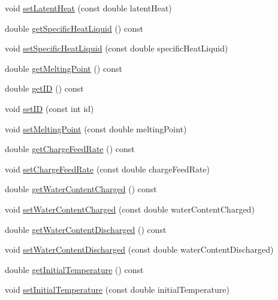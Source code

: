 \begin{DoxyCompactItemize}
void \hyperlink{class_solid_load_charge_material_ac7361119ab7cc352dfbdc6fcb9175981}{set\+Latent\+Heat} (const double latent\+Heat)
\item 
double \hyperlink{class_solid_load_charge_material_a8b02308194b603276df3a894c401e923}{get\+Specific\+Heat\+Liquid} () const
\item 
void \hyperlink{class_solid_load_charge_material_a91fad347bf52a4f6695c304904091797}{set\+Specific\+Heat\+Liquid} (const double specific\+Heat\+Liquid)
\item 
double \hyperlink{class_solid_load_charge_material_a4be001f6e6ecbd2ad0ae1d154559cdb0}{get\+Melting\+Point} () const
\item 
double \hyperlink{class_solid_load_charge_material_ae34ce5c6f1f362340ead0748aaf885b8}{get\+ID} () const
\item 
void \hyperlink{class_solid_load_charge_material_a4cc8e12ffb340c94106cecf576a85ae5}{set\+ID} (const int id)
\item 
void \hyperlink{class_solid_load_charge_material_a6c235b1c49be98b02829d37af9c38cb2}{set\+Melting\+Point} (const double melting\+Point)
\item 
double \hyperlink{class_solid_load_charge_material_af6f018c5d67e94d86f2f57fecaa32b5c}{get\+Charge\+Feed\+Rate} () const
\item 
void \hyperlink{class_solid_load_charge_material_adc50117256b714789f68097437ca658d}{set\+Charge\+Feed\+Rate} (const double charge\+Feed\+Rate)
\item 
double \hyperlink{class_solid_load_charge_material_a2f99a8553d12b45bad53acc14338199a}{get\+Water\+Content\+Charged} () const
\item 
void \hyperlink{class_solid_load_charge_material_abf43422318a1b9120dff1dcfb15d5265}{set\+Water\+Content\+Charged} (const double water\+Content\+Charged)
\item 
double \hyperlink{class_solid_load_charge_material_aeeb6b341a6b5770155b85264dabbd1a7}{get\+Water\+Content\+Discharged} () const
\item 
void \hyperlink{class_solid_load_charge_material_a5104ddb43af977a751b90a0bc844d83d}{set\+Water\+Content\+Discharged} (const double water\+Content\+Discharged)
\item 
double \hyperlink{class_solid_load_charge_material_ae5d7f198fb1d4a3adb0cfc911a13ea06}{get\+Initial\+Temperature} () const
\item 
void \hyperlink{class_solid_load_charge_material_ac80e565d26e68e542f4cb41f41b7d96c}{set\+Initial\+Temperature} (const double initial\+Temperature)

\end{DoxyCompactItemize}
